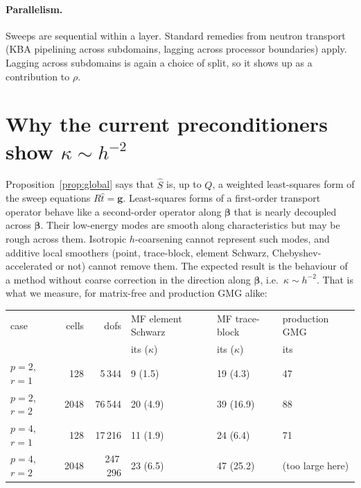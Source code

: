 \documentclass[11pt]{article}
\theoremstyle{remark}
\theoremstyle{definition}
\newcommand{\bbeta}{\boldsymbol{\beta}}
\newcommand{\that}{\hat{t}}
\newcommand{\Shat}{\widehat{S}}
\begin{document}
\paragraph{Parallelism.}  Sweeps are sequential within a layer.  Standard remedies from neutron transport (KBA
pipelining across subdomains, lagging across processor boundaries) apply.  Lagging across subdomains is again a
choice of split, so it shows up as a contribution to $\rho$.

\section{\texorpdfstring{Why the current preconditioners show $\kappa\sim h^{-2}$}{Why the current preconditioners show kappa ~ h**(-2)}}

Proposition~\ref{prop:global} says that $\Shat$ is, up to $Q$, a weighted least-squares form of the sweep equations
$R\that=\mathbf g$.  Least-squares forms of a first-order transport operator behave like a second-order operator
along $\bbeta$ that is nearly decoupled across $\bbeta$.  Their low-energy modes are smooth along characteristics but
may be rough across them.  Isotropic $h$-coarsening cannot represent such modes, and additive local smoothers (point,
trace-block, element Schwarz, Chebyshev-accelerated or not) cannot remove them.  The expected result is the behaviour
of a method without coarse correction in the direction along $\bbeta$, i.e.\ $\kappa\sim h^{-2}$.  That is what we
measure, for matrix-free and production GMG alike:

\begin{center}
\begin{tabular}{@{}lrrlll@{}}
\toprule
case & cells & dofs & MF element Schwarz & MF trace-block & production GMG\\
 & & & its ($\kappa$) & its ($\kappa$) & its\\
\midrule
$p=2$, $r=1$ & 128  & 5\,344   & 9 (1.5)  & 19 (4.3)  & 47\\
$p=2$, $r=2$ & 2048 & 76\,544  & 20 (4.9) & 39 (16.9) & 88\\
$p=4$, $r=1$ & 128  & 17\,216  & 11 (1.9) & 24 (6.4)  & 71\\
$p=4$, $r=2$ & 2048 & 247\,296 & 23 (6.5) & 47 (25.2) & (too large here)\\
\bottomrule
\end{tabular}
\end{center}
\end{document}
